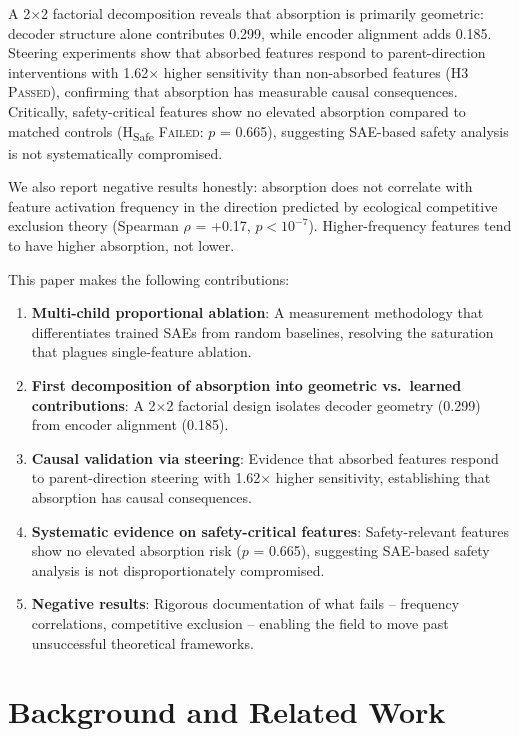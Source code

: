 \documentclass{article}
\begin{document}
A 2$\times$2 factorial decomposition reveals that absorption is primarily geometric: decoder structure alone contributes 0.299, while encoder alignment adds 0.185. Steering experiments show that absorbed features respond to parent-direction interventions with 1.62$\times$ higher sensitivity than non-absorbed features (H3 \textsc{Passed}), confirming that absorption has measurable causal consequences. Critically, safety-critical features show no elevated absorption compared to matched controls (H\textsubscript{Safe} \textsc{Failed}: $p$ = 0.665), suggesting SAE-based safety analysis is not systematically compromised.

We also report negative results honestly: absorption does not correlate with feature activation frequency in the direction predicted by ecological competitive exclusion theory (Spearman $\rho$ = +0.17, $p < 10^{-7}$). Higher-frequency features tend to have higher absorption, not lower.

This paper makes the following contributions:

\begin{enumerate}
\item \textbf{Multi-child proportional ablation}: A measurement methodology that differentiates trained SAEs from random baselines, resolving the saturation that plagues single-feature ablation.

\item \textbf{First decomposition of absorption into geometric vs.\ learned contributions}: A 2$\times$2 factorial design isolates decoder geometry (0.299) from encoder alignment (0.185).

\item \textbf{Causal validation via steering}: Evidence that absorbed features respond to parent-direction steering with 1.62$\times$ higher sensitivity, establishing that absorption has causal consequences.

\item \textbf{Systematic evidence on safety-critical features}: Safety-relevant features show no elevated absorption risk ($p$ = 0.665), suggesting SAE-based safety analysis is not disproportionately compromised.

\item \textbf{Negative results}: Rigorous documentation of what fails -- frequency correlations, competitive exclusion -- enabling the field to move past unsuccessful theoretical frameworks.
\end{enumerate}

\section{Background and Related Work}
\end{document}

